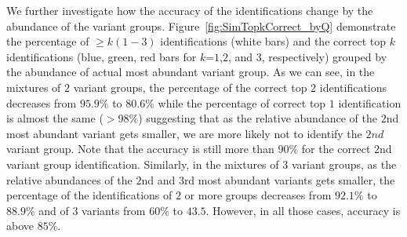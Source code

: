 We further investigate how the accuracy of the identifications change by the abundance of the variant groups. Figure~\ref{fig:SimTopkCorrect_byQ} demonstrate the percentage of $\geq k (1-3)$ identifications (white bars) and the correct top $k$ identifications (blue, green, red bars for $k$=$1$,$2$, and $3$, respectively) grouped by the abundance of actual most abundant variant group. As we can see, in the mixtures of $2$ variant groups, the percentage of the correct top $2$ identifications decreases from $95.9\%$ to $80.6\%$ while the percentage of correct top $1$ identification is almost the same ($>98\%$) suggesting that as the relative abundance of the $2$nd most abundant variant gets smaller, we are more likely not to identify the $2nd$ variant group. Note that the accuracy is still more than $90\%$ for the correct $2$nd variant group identification. Similarly, in the mixtures of $3$ variant groups, as the relative abundances of the $2$nd and $3$rd most abundant variants gets smaller, the percentage of the identifications of $2$ or more groups decreases from $92.1\%$ to $88.9\%$ and of $3$ variants from $60\%$ to $43.5$. However, in all those cases, accuracy is above $85\%$.

